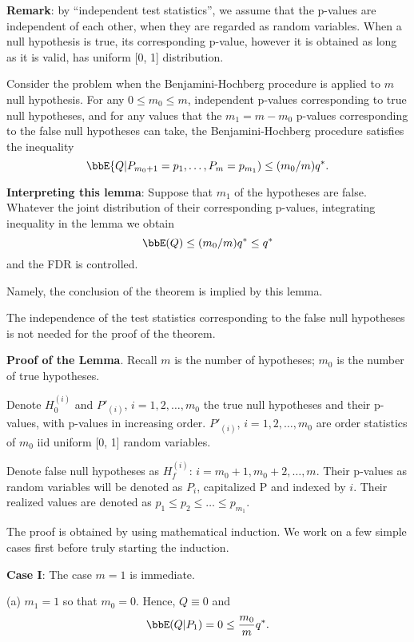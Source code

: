 \vs
{\bf Remark}: by ``independent test statistics'', we assume that the p-values
are independent of each other, when they are regarded as random
variables. When a null hypothesis is true, its corresponding p-value,
however it is obtained as long as it is valid, has uniform [0, 1]
distribution.

\begin{lemma} 
Consider the problem when the Benjamini-Hochberg procedure
is applied to $m$ null hypothesis.
For any $0 \leq m_0 \leq m$,
independent p-values corresponding to true null hypotheses, 
and for any values that the $m_1 = m - m_0$
p-values corresponding to the false null hypotheses can take, 
the Benjamini-Hochberg procedure satisfies the inequality
\[
\bbE \{Q| P_{m_0+1} = p_1, \ldots, P_m = p_{m_1}) \leq (m_0/m) q^*.
\]
\end{lemma}

\vs
\noindent
{\bf Interpreting this lemma}:
Suppose that $m_1$ of the hypotheses are false. 
Whatever the joint distribution of their corresponding
p-values, integrating inequality in the lemma
 we obtain 
 \[
 \bbE(Q) \leq (m_0/m) q^* \leq q^*
 \]
and the FDR is controlled.

Namely, the conclusion of the theorem is implied by this lemma.

The independence of the test statistics corresponding to the false 
null hypotheses is not needed for the proof of the theorem.

\vs \noindent
{\bf Proof of the Lemma}.
Recall $m$ is the number of hypotheses; $m_0$ is
the number of true hypotheses.

Denote $H_0^{(i)}$ and $P'_{(i)}$, $i=1, 2, \ldots, m_0$ 
the true null hypotheses and their p-values, with p-values
in increasing order. $P'_{(i)}$, $i=1, 2, \ldots, m_0$
are order statistics of $m_0$ iid uniform [0, 1] random
variables. 

Denote false null hypotheses as
$H_f^{(i)}$: $i=m_0+1, m_0 + 2, \ldots, m$.
Their p-values as random variables
will be denoted as $P_i$, capitalized P and indexed by $i$. 
Their realized values are denoted as $p_1 \leq p_2 \leq \ldots \leq p_{m_1}$.


The proof is obtained by using mathematical induction.
We work on a few simple cases first before truly starting
the induction.

\vs
\noindent
{\bf
Case I}: The case $m=1$ is immediate. 

(a) $m_1=1$ so that $m_0 = 0$. 
Hence, $Q\equiv 0$ and
\[
\bbE(Q|P_1) = 0 \leq \frac{m_0}{m} q^*.
\]

